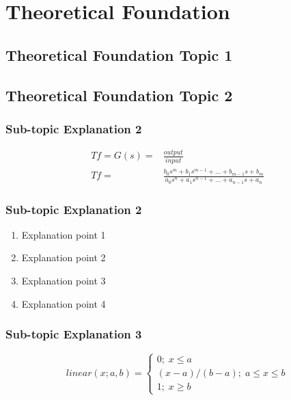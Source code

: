 \section{Theoretical Foundation}

\subsection{Theoretical Foundation Topic 1}
\lipsum[1]

\subsection{Theoretical Foundation Topic 2}
\subsubsection{Sub-topic Explanation 2}
\lipsum[1]

\begin{equation}
	\label{eq tforigin}
	\begin{split}
		Tf = G(s) = & \frac{output}{input} \\
		Tf= & \frac{b_{0}s^{m} + b_{1}s^{m-1} + ... + b_{m-1}s + b_{m}}{a_{0}s^{n} + a_{1}s^{n-1} + ... + a_{n-1}s + a_{n}}
	\end{split}
\end{equation}

\lipsum[1]

\subsubsection{Sub-topic Explanation 2}
\lipsum[1]
\begin{enumerate}
    \item Explanation point 1
    \item Explanation point 2
    \item Explanation point 3
    \item Explanation point 4
\end{enumerate}

\subsubsection{Sub-topic Explanation 3}
\lipsum[1]

\begin{equation}
	\label{eq liniernaik}
	linear(x; a,b) =
	\left\{\begin{matrix}
		0; \; x \leq a\\ 
		(x-a)/(b-a); \; a \leq x \leq b\\ 
		1; \; x \geq b
	\end{matrix}\right.
\end{equation}

\lipsum[1]

